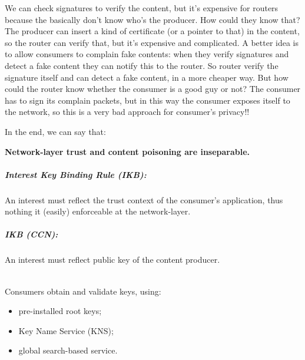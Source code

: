 We can check signatures to verify the content, but it's expensive for routers because
the basically don't know who's the producer. How could they know that? The producer can
insert a kind of certificate (or a pointer to that) in the content, so the router can 
verify that, but it's expensive and complicated. 
A better idea is to allow consumers to complain fake contents: when they verify signatures
and detect a fake content they can notify this to the router. So router verify the signature
itself and can detect a fake content, in a more cheaper way. But how could the router know 
whether the consumer is a good guy or not? The consumer has to sign its complain packets, but
in this way the consumer exposes itself to the network, so this is a very bad approach for
consumer's privacy!!

In the end, we can say that:

\begin{center}
\textbf{Network-layer trust and content poisoning are inseparable.}
\end{center}

\subparagraph*{Interest Key Binding Rule (IKB): } 
An interest must reflect the trust context of the consumer's application, thus nothing it (easily) enforceable at the network-layer.

\subparagraph*{IKB (CCN): } 
An interest must reflect public key of the content producer.

\mbox{} \\
Consumers obtain and validate keys, using:
\begin{itemize}
	\item pre-installed root keys;
	\item Key Name Service (KNS);
	\item global search-based service.
\end{itemize}